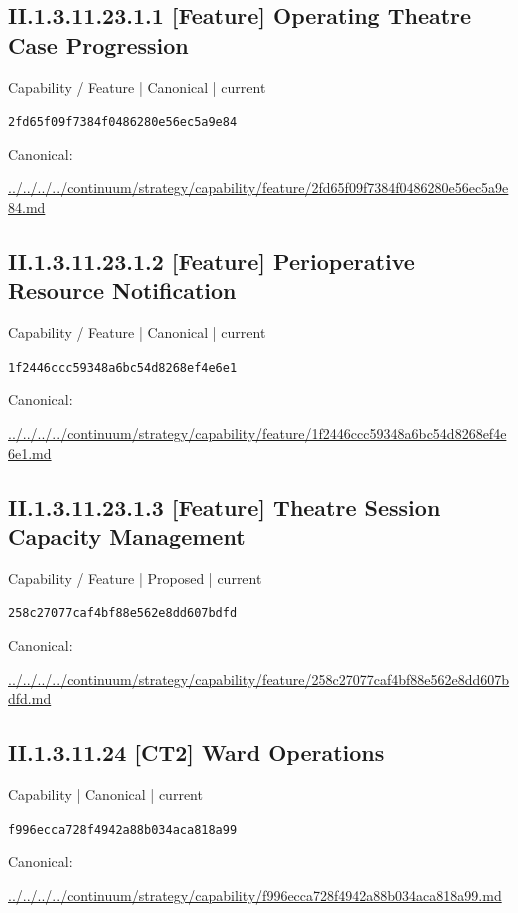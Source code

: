 \documentclass[10pt,a4paper]{article}
\begin{document}
\subsection*{II.1.3.11.23.1.1 [Feature] Operating Theatre Case Progression}
{\small Capability / Feature | Canonical | current}\par
\texttt{2fd65f09f7384f0486280e56ec5a9e84}\par
Canonical: \par
{\footnotesize\url{../../../../continuum/strategy/capability/feature/2fd65f09f7384f0486280e56ec5a9e84.md}}\par
\subsection*{II.1.3.11.23.1.2 [Feature] Perioperative Resource Notification}
{\small Capability / Feature | Canonical | current}\par
\texttt{1f2446ccc59348a6bc54d8268ef4e6e1}\par
Canonical: \par
{\footnotesize\url{../../../../continuum/strategy/capability/feature/1f2446ccc59348a6bc54d8268ef4e6e1.md}}\par
\subsection*{II.1.3.11.23.1.3 [Feature] Theatre Session Capacity Management}
{\small Capability / Feature | Proposed | current}\par
\texttt{258c27077caf4bf88e562e8dd607bdfd}\par
Canonical: \par
{\footnotesize\url{../../../../continuum/strategy/capability/feature/258c27077caf4bf88e562e8dd607bdfd.md}}\par
\subsection*{II.1.3.11.24 [CT2] Ward Operations}
{\small Capability | Canonical | current}\par
\texttt{f996ecca728f4942a88b034aca818a99}\par
Canonical: \par
{\footnotesize\url{../../../../continuum/strategy/capability/f996ecca728f4942a88b034aca818a99.md}}\par
\end{document}
